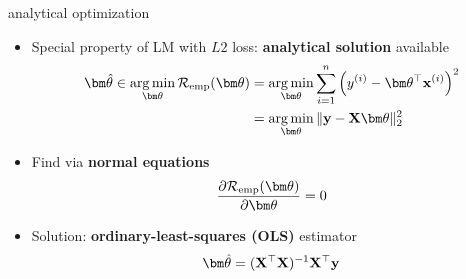 \documentclass[11pt,compress,t,notes=noshow, xcolor=table]{beamer}
\begin{document}
\begin{vbframe}{analytical optimization}

\begin{itemize}
    \item Special property of LM with $L2$ loss: \textbf{analytical solution}
    available
    \begin{align*}
        \thetavh \in 
        \argmin_{\thetav} \risket &=
        \argmin_{\thetav} \sumin \left(\yi - \thetav^\top \xi \right)^2  \\
        &= \argmin_{\thetav} \| \yv - \Xmat \thetav \|^2_2
    \end{align*}
    \normalsize
    \item Find via \textbf{normal equations}
    $$\pd{\risket}{\thetav} = 0$$
    \item Solution: \textbf{ordinary-least-squares (OLS)} estimator
    $$\thetavh = \olsest$$
\end{itemize}

\end{vbframe}

\end{document}
